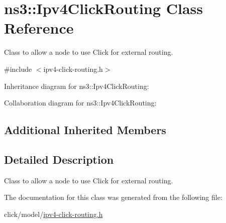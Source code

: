 \hypertarget{classns3_1_1Ipv4ClickRouting}{}\section{ns3\+:\+:Ipv4\+Click\+Routing Class Reference}
\label{classns3_1_1Ipv4ClickRouting}


Class to allow a node to use Click for external routing.  




{\ttfamily \#include $<$ipv4-\/click-\/routing.\+h$>$}



Inheritance diagram for ns3\+:\+:Ipv4\+Click\+Routing\+:


Collaboration diagram for ns3\+:\+:Ipv4\+Click\+Routing\+:
\subsection*{Additional Inherited Members}


\subsection{Detailed Description}
Class to allow a node to use Click for external routing. 

The documentation for this class was generated from the following file\+:\begin{DoxyCompactItemize}
\item 
click/model/\hyperlink{ipv4-click-routing_8h}{ipv4-\/click-\/routing.\+h}\end{DoxyCompactItemize}
